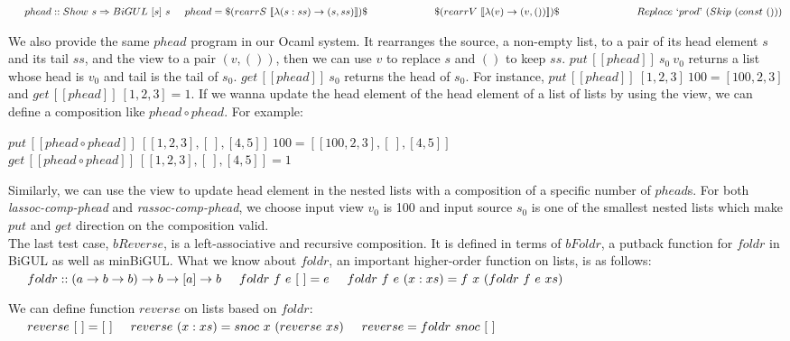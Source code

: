\documentclass[runningheads]{llncs}
\newcommand{\tab}{\hspace*{5mm}}
\newcommand{\qtab}{\hspace*{5mm} \ \quad}
\newcommand{\putbx}[3]{put \, [\![#1]\!] \ #2 \ #3}
\newcommand{\getbx}[2]{get \, [\![#1]\!] \ #2}
\begin{document}
    $\tab phead :: Show \ s \Rightarrow BiGUL \ [s] \ s\\
    \tab phead = \$(rearrS \ [\![\lambda(s:ss) \to (s,ss)]\!])\$\\
        \qtab \qtab \quad \$(rearrV \ [\![\lambda(v) \to (v,())]\!])\$\\
            \qtab \qtab \qquad Replace \ `prod\text{'} \ (Skip \ (const \ ()))$

We also provide the same $phead$ program in our Ocaml system. It rearranges the source, a non-empty list, to a pair of its head element $s$ and its tail $ss$, and the view to a pair $(v, ())$, then we can use $v$ to replace $s$ and $()$ to keep $ss$. $\putbx{phead}{s_0}{v_0}$ returns a list whose head is $v_0$ and tail is the tail of $s_0$. $\getbx{phead}{s_0}$ returns the head of $s_0$. For instance, $\putbx{phead}{[1,2,3]}{100} = [100,2,3]$ and $\getbx{phead}{[1,2,3]} = 1$. If we wanna update the head element of the head element of a list of lists by using the view, we can define a composition like $phead \circ phead$. For example:

    \tab $\putbx{phead \circ phead}{[[1,2,3],[\ ],[4,5]]}{100} = [[100,2,3],[\ ],[4,5]]$\\
    \tab $\getbx{phead \circ phead}{[[1,2,3],[\ ],[4,5]]} = 1$

Similarly, we can use the view to update head element in the nested lists with a composition of a specific number of $phead$s. For both \textit{lassoc-comp-phead} and \textit{rassoc-comp-phead}, we choose input view $v_0$ is 100 and input source $s_0$ is one of the smallest nested lists which make $put$ and $get$ direction on the composition valid.\\

The last test case, $bReverse$, is a left-associative and recursive composition. It is defined in terms of $bFoldr$, a putback function for $foldr$ in BiGUL as well as minBiGUL. What we know about $foldr$, an important higher-order function on lists, is as follows:\\
    $\tab foldr :: (a \to b \to b) \to b \to [a] \to b\\
    \tab foldr \ f \ e \ [\ ] = e\\
    \tab foldr \ f \ e \ (x:xs) = f \ x \ (foldr \ f \ e \ xs)$

We can define function $reverse$ on lists based on $foldr$:\\
    $\tab reverse \ [\ ] = [\ ]\\
    \tab reverse \ (x:xs) = snoc \ x \ (reverse \ xs)\\
    \tab reverse = foldr \ snoc \ [\ ]$
\end{document}
